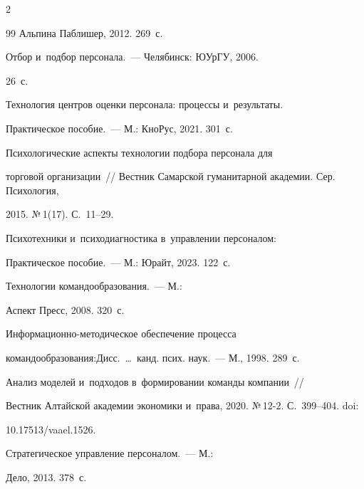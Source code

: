 \begin{multicols}{2}
{{\begin{thebibliography}{99}
Альпина Паблишер, 2012. 269~с.


 Отбор и~под\-бор персонала.~--- Челябинск: ЮУрГУ, 2006. 

26~с.


 Технология цент\-ров оцен\-ки персонала: процессы и~результаты. 

Практическое пособие.~--- М.: КноРус, 2021. 301~с.


 Психологические аспекты технологии подбора персонала для 

торговой организации~// Вестник Самарской гуманитарной академии. Сер. Психология, 

2015. №\,1(17). С.~11--29.


 Психотехники и~пси\-хо\-диа\-гно\-сти\-ка в~управ\-ле\-нии персоналом: 

Практическое пособие.~--- М.: Юрайт, 2023. 122~с.


 Технологии командообразования.~--- М.: 

Аспект Пресс, 2008. 320~с.



\pagebreak




 Информационно-ме\-то\-ди\-че\-ское обеспечение процесса 

командообразования:\linebreak Дисс.\ \ldots\  канд. псих. наук.~--- М., 1998. 289~с.


 Анализ моделей и~подходов в~формировании команды компании~// 

Вестник Алтайской академии экономики и~права, 2020. №\,12-2. С.~399--404. doi: 

10.17513/vaael.1526.


 Стратегическое управ\-ле\-ние персоналом.~--- М.: 

Дело, 2013. 378~с.



\end{thebibliography}



 }

 }



\end{multicols}



